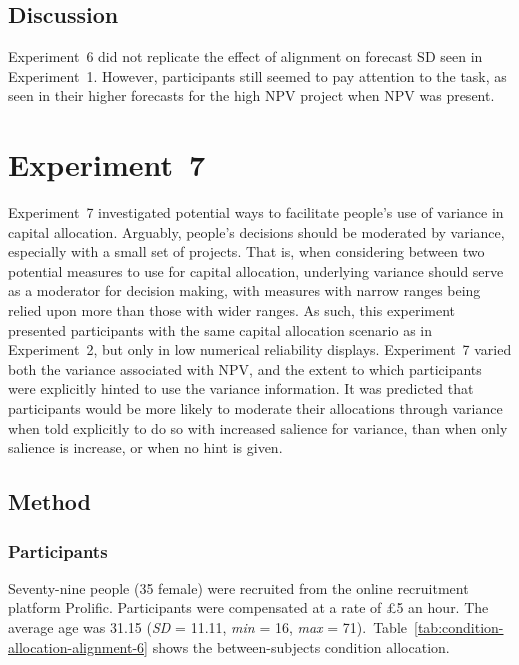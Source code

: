 \documentclass[a4paper, nobind, dvipsnames]{templates/ociamthesis}
\theoremstyle{definition}
\theoremstyle{definition}
\theoremstyle{definition}
\theoremstyle{definition}
\theoremstyle{remark}
\begin{document}
\subsection{Discussion}

Experiment~6 did not replicate the effect of alignment on forecast SD seen in
Experiment~1. However, participants still seemed to pay attention to the task,
as seen in their higher forecasts for the high NPV project when NPV was present.

\hypertarget{alignment-6}{%
\section{Experiment~7}\label{alignment-6}}

Experiment~7 investigated potential ways to facilitate people's use of variance
in capital allocation. Arguably, people's decisions should be moderated by
variance, especially with a small set of projects. That is, when considering
between two potential measures to use for capital allocation, underlying
variance should serve as a moderator for decision making, with measures with
narrow ranges being relied upon more than those with wider ranges. As such, this
experiment presented participants with the same capital allocation scenario as
in Experiment~2, but only in low numerical reliability displays. Experiment~7
varied both the variance associated with NPV, and the extent to which
participants were explicitly hinted to use the variance information. It was
predicted that participants would be more likely to moderate their allocations
through variance when told explicitly to do so with increased salience for
variance, than when only salience is increase, or when no hint is given.

\subsection{Method}

\subsubsection{Participants}

Seventy-nine people (35 female) were recruited from the online recruitment platform Prolific. Participants were compensated at a rate of £5 an hour. The average age was 31.15 (\emph{SD} = 11.11, \emph{min} = 16, \emph{max} = 71).~Table~\ref{tab:condition-allocation-alignment-6}
shows the between-subjects condition allocation.
\end{document}
